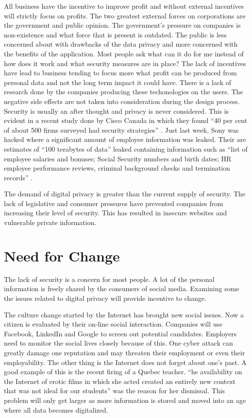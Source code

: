 \documentclass[12pt]{article}
\begin{document}
All business have the incentive to improve profit and without external incentives will strictly focus on profits. The two greatest external forces on corporations are the government and public opinion. The government's pressure on companies is non-existence and what force that is present is outdated. The public is less concerned about with drawbacks of the data privacy and more concerned with the benefits of the application. Most people ask what can it do for me instead of how does it work and what security measures are in place? The lack of incentives have lead to business tending to focus more what profit can be produced from personal data and not the long term impact it could have. There is a lack of research done by the companies producing these techonologies on the users. The negative side effects are not taken into consideration during the design process. Security is usually an after thought and privacy is never considered. This is evident in a recent study done by Cisco Canada in which they found ``40 per cent of about 500 firms surveyed had security strategies'' \cite{Blackwell}. Just last week, Sony was hacked where a significant amount of employee information was leaked. Their are estimates of ``100 terabytes of data'' leaked containing information such as ``list of employee salaries and bonuses; Social Security numbers and birth dates; HR employee performance reviews, criminal background checks and termination records'' \cite{Zetter}.

The demand of digital privacy is greater than the current supply of security. The lack of legislative and consumer pressures have prevented companies from increasing their level of security. This has resulted in insecure websites and vulnerable private information. 

\section{Need for Change}\label{sec:change}
The lack of security is a concern for most people. A lot of the personal information is freely shared by the consumers of social media. Examining some the issues related to digital privacy will provide incentive to change.

The culture change started by the Internet has brought new social issues. Now a citizen is evaluated by their on-line social interaction. Companies will use Facebook, LinkedIn and Google to screen out potential candidates. Employers need to monitor the social lives closely because of this. One cyber attack can greatly damage one reputation and may threaten their employment or even their employability. The other thing is the Internet does not forget about one's past. A good example of this is the recent firing of a Quebec teacher. ``he availability on the Internet of erotic films in which she acted created an entirely new context that was not ideal for our students'' \cite{Peritz} was the reason for her dismissal. This problem will only get larger as more information is stored and moved into an age where all data becomes digitalized.
\end{document}
